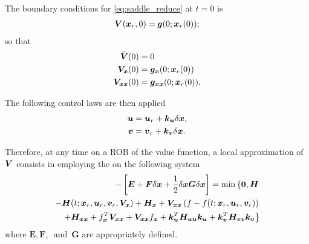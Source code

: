 The boundary conditions for \eqref{eq:saddle_reduce} at $t = 0$ is 
%
\begin{align}
	\bm{V}(\bm{x}_r, 0) = \bm{g}(0; \bm{x}_r(0));
\end{align} 
%
so that
%
\begin{subequations}
	\begin{align}
		\tilde{\bm{V}}(0) &= 0 \\
		\bm{V}_{\bm{x}}(0) &= \bm{g}_{\bm{x}} (0; \bm{x}_r(0)) \\
		\bm{V}_{\bm{x} \bm{x}} (0) &= \bm{g}_{\bm{x} \bm{x}} (0; \bm{x}_r(0)).
	\end{align}
\end{subequations}

The following control laws are then applied 
%
\begin{align}
	\bm{u} &= \bm{u}_r +  \bm{k}_{\bm{u}} \delta \bm{x}, \\
	\bm{v} &= \bm{v}_r +  \bm{k}_{\bm{v}} \delta \bm{x}.	
\end{align}

Therefore, at any time on a ROB of the value function, a local approximation of $\bm{V}$ consists in employing the  on the following system
%
\begin{align}
	\begin{split}
		-\left[\bm{E} + \bm{F} \delta \state + \dfrac{1}{2} \delta \state \bm{G} \delta \state  \right] = \min \left\{\bm{0}, \hamfunc    \right. \\ \left. %
		- \hamfunc(t; \state_r, \control_r, \disturb_r, \valuefunc_{\state})+ \hamfunc_{\state}+ \valuefunc_{\state\state} \left(f-f(t; \state_r, \control_r, \disturb_r)\right) \right. \\ \left. 
		 + \hamfunc_{\state \state} 
		+ f_{\state}^T\valuefunc_{\state\state} + \valuefunc_{\state\state} f_{\state} 	+ \gain_{\control}^T \hamfunc_{\control  \control}  \gain_{\control} +  \gain_{\disturb}^T \hamfunc_{\disturb  \disturb}  \gain_{\disturb} \right\}
	\end{split}
\end{align}
%
where $ \bm{E}, \bm{F},  \, \text{ and } \,\bm{G}$ are appropriately defined.

